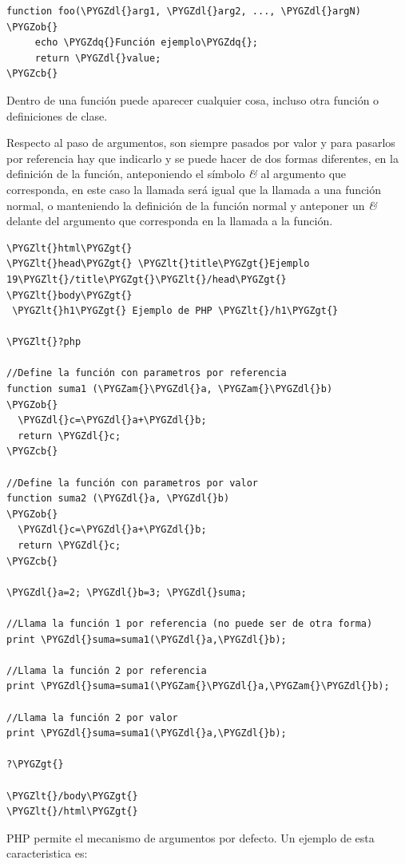 \documentclass[a5paper,10pt,spanish]{sphinxmanual}
\def\PYGZob{\char`\{}
\def\PYGZcb{\char`\}}
\def\PYGZam{\char`\&}
\def\PYGZlt{\char`\<}
\def\PYGZgt{\char`\>}
\def\PYGZdl{\char`\$}
\def\PYGZdq{\char`\"}
\begin{document}
\begin{Verbatim}[commandchars=\\\{\}]
function foo(\PYGZdl{}arg1, \PYGZdl{}arg2, ..., \PYGZdl{}argN) \PYGZob{}
     echo \PYGZdq{}Función ejemplo\PYGZdq{};
     return \PYGZdl{}value;
\PYGZcb{}
\end{Verbatim}

Dentro de una función puede aparecer cualquier cosa, incluso otra
función o definiciones de clase.

Respecto al paso de argumentos, son siempre pasados por valor y para
pasarlos por referencia hay que indicarlo y se puede hacer de dos formas
diferentes, en la definición de la función, anteponiendo el símbolo \emph{\&}
al argumento que corresponda, en este caso la llamada será igual que la
llamada a una función normal, o manteniendo la definición de la función
normal y anteponer un \emph{\&} delante del argumento que corresponda en la
llamada a la función.

\begin{Verbatim}[commandchars=\\\{\}]
\PYGZlt{}html\PYGZgt{}
\PYGZlt{}head\PYGZgt{} \PYGZlt{}title\PYGZgt{}Ejemplo 19\PYGZlt{}/title\PYGZgt{}\PYGZlt{}/head\PYGZgt{}
\PYGZlt{}body\PYGZgt{}
 \PYGZlt{}h1\PYGZgt{} Ejemplo de PHP \PYGZlt{}/h1\PYGZgt{}

\PYGZlt{}?php

//Define la función con parametros por referencia
function suma1 (\PYGZam{}\PYGZdl{}a, \PYGZam{}\PYGZdl{}b)
\PYGZob{}
  \PYGZdl{}c=\PYGZdl{}a+\PYGZdl{}b;
  return \PYGZdl{}c;
\PYGZcb{}

//Define la función con parametros por valor
function suma2 (\PYGZdl{}a, \PYGZdl{}b)
\PYGZob{}
  \PYGZdl{}c=\PYGZdl{}a+\PYGZdl{}b;
  return \PYGZdl{}c;
\PYGZcb{}

\PYGZdl{}a=2; \PYGZdl{}b=3; \PYGZdl{}suma;

//Llama la función 1 por referencia (no puede ser de otra forma)
print \PYGZdl{}suma=suma1(\PYGZdl{}a,\PYGZdl{}b);

//Llama la función 2 por referencia
print \PYGZdl{}suma=suma1(\PYGZam{}\PYGZdl{}a,\PYGZam{}\PYGZdl{}b);

//Llama la función 2 por valor
print \PYGZdl{}suma=suma1(\PYGZdl{}a,\PYGZdl{}b);

?\PYGZgt{}

\PYGZlt{}/body\PYGZgt{}
\PYGZlt{}/html\PYGZgt{}
\end{Verbatim}

PHP permite el mecanismo de argumentos por defecto. Un ejemplo de esta
caracteristica es:
\end{document}
